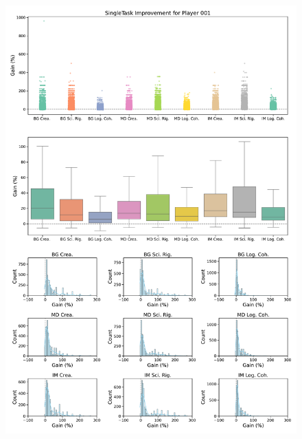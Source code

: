 \begin{figure}[ht]
  \centering
  \includegraphics[width=\textwidth]{figures/gain_validity/singletask/singletask_gain_player_00001.pdf}
\end{figure}
\clearpage

